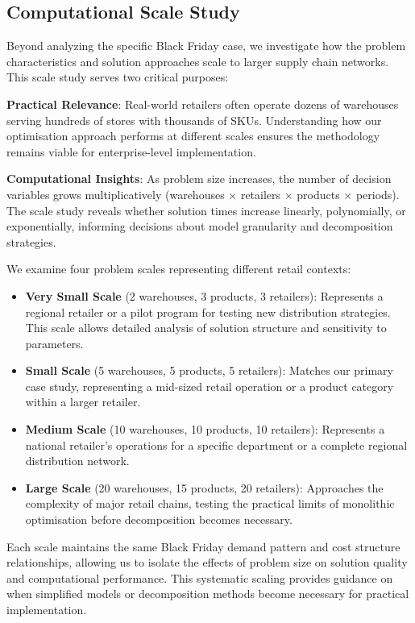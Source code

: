 \documentclass[a4paper,12pt]{article}
\begin{document}
\subsection{Computational Scale Study}\label{subsec:computational-scale-study}

Beyond analyzing the specific Black Friday case, we investigate how the problem characteristics and solution approaches scale to larger supply chain networks. This scale study serves two critical purposes:

\textbf{Practical Relevance}: Real-world retailers often operate dozens of warehouses serving hundreds of stores with thousands of SKUs. Understanding how our optimisation approach performs at different scales ensures the methodology remains viable for enterprise-level implementation.

\textbf{Computational Insights}: As problem size increases, the number of decision variables grows multiplicatively (warehouses × retailers × products × periods). The scale study reveals whether solution times increase linearly, polynomially, or exponentially, informing decisions about model granularity and decomposition strategies.

We examine four problem scales representing different retail contexts:
\begin{itemize}
    \item \textbf{Very Small Scale} (2 warehouses, 3 products, 3 retailers): Represents a regional retailer or a pilot program for testing new distribution strategies. This scale allows detailed analysis of solution structure and sensitivity to parameters.

    \item \textbf{Small Scale} (5 warehouses, 5 products, 5 retailers): Matches our primary case study, representing a mid-sized retail operation or a product category within a larger retailer.

    \item \textbf{Medium Scale} (10 warehouses, 10 products, 10 retailers): Represents a national retailer's operations for a specific department or a complete regional distribution network.

    \item \textbf{Large Scale} (20 warehouses, 15 products, 20 retailers): Approaches the complexity of major retail chains, testing the practical limits of monolithic optimisation before decomposition becomes necessary.
\end{itemize}

Each scale maintains the same Black Friday demand pattern and cost structure relationships, allowing us to isolate the effects of problem size on solution quality and computational performance. This systematic scaling provides guidance on when simplified models or decomposition methods become necessary for practical implementation.
\end{document}

